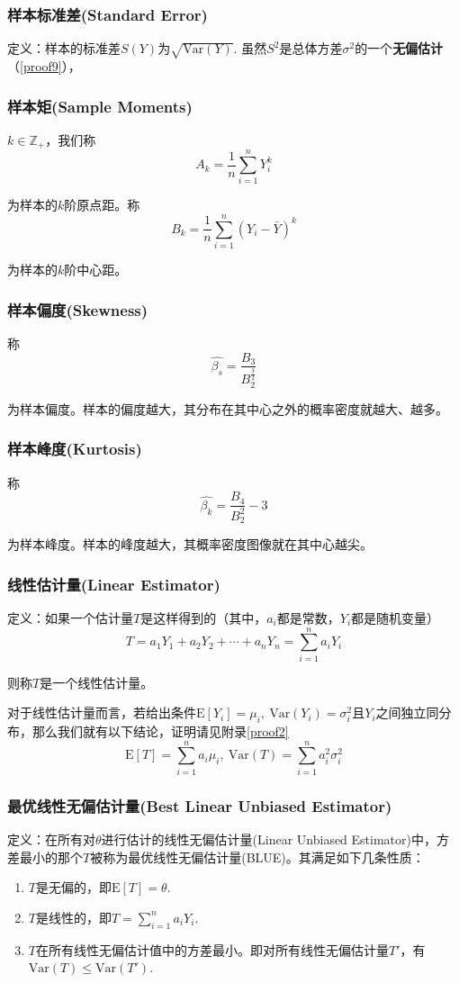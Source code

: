 \documentclass[UTF8]{ctexbook}
\begin{document}
\subsubsection{样本标准差(Standard Error)}
定义：样本的标准差$S(Y)$为$\sqrt{\mathrm{Var}(Y)}$. 虽然$S^2$是总体方差$\sigma^2$的一个\textbf{无偏估计}（\ref{proof9}），
\subsubsection{样本矩(Sample Moments)}
$k\in\mathbb{Z}_+$，我们称
\[
	A_k=\frac{1}{n}\sum_{i=1}^nY_i^k
\]

为样本的$k$阶原点距。称
\[
	B_k=\frac{1}{n}\sum_{i=1}^n(Y_i-\bar{Y})^k
\]

为样本的$k$阶中心距。
\subsubsection{样本偏度(Skewness)}
称
\[
	\hat{\beta_s}=\frac{B_3}{B_2^{\frac{3}{2}}}
\]

为样本偏度。样本的偏度越大，其分布在其中心之外的概率密度就越大、越多。
\subsubsection{样本峰度(Kurtosis)}
称
\[
	\hat{\beta_k}=\frac{B_4}{B_2^2}-3
\]

为样本峰度。样本的峰度越大，其概率密度图像就在其中心越尖。
\subsubsection{线性估计量(Linear Estimator)}
定义：如果一个估计量$T$是这样得到的（其中，$a_i$都是常数，$Y_i$都是随机变量）
\[
	T=a_1Y_1+a_2Y_2+\cdots+a_nY_n=\sum_{i=1}^na_iY_i
\]

则称$T$是一个线性估计量。

对于线性估计量而言，若给出条件$\mathrm{E}[Y_i]=\mu_i,\ \mathrm{Var}(Y_i)=\sigma_i^2$且$Y_i$之间独立同分布，那么我们就有以下结论，证明请见附录\ref{proof2}
\[
	\mathrm{E}[T]=\sum_{i=1}^na_i\mu_i,\ \mathrm{Var}(T)=\sum_{i=1}^na_i^2\sigma_i^2
\]
\subsubsection{最优线性无偏估计量(Best Linear Unbiased Estimator)}
\label{blue-def}
定义：在所有对$\theta$进行估计的线性无偏估计量(Linear Unbiased Estimator)中，方差最小的那个$T$被称为最优线性无偏估计量(BLUE)。其满足如下几条性质：
\begin{enumerate}
	\item $T$是无偏的，即$\mathrm{E}[T]=\theta$.
	\item $T$是线性的，即$T=\sum_{i=1}^na_iY_i$.
	\item $T$在所有线性无偏估计值中的方差最小。即对所有线性无偏估计量$T'$，有$\mathrm{Var}(T)\leq\mathrm{Var}(T')$.
\end{enumerate}
\end{document}
